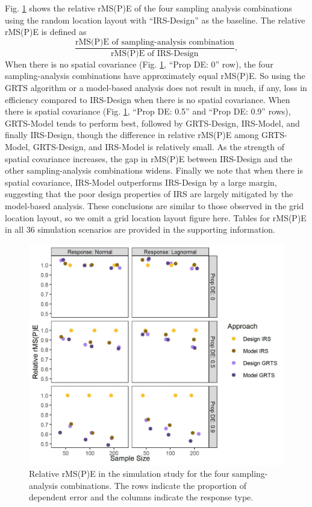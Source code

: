\documentclass[]{elsarticle} %
\begin{document}
Fig. \ref{fig:figeff} shows the relative rMS(P)E of the four sampling
analysis combinations using the random location layout with
``IRS-Design'' as the baseline. The relative rMS(P)E is defined as
\begin{equation*}
\frac{\text{rMS(P)E of sampling-analysis combination}}{\text{rMS(P)E of IRS-Design}},
\end{equation*} When there is no spatial covariance (Fig.
\ref{fig:figeff}, ``Prop DE: 0'' row), the four sampling-analysis
combinations have approximately equal rMS(P)E. So using the GRTS
algorithm or a model-based analysis does not result in much, if any,
loss in efficiency compared to IRS-Design when there is no spatial
covariance. When there is spatial covariance (Fig. \ref{fig:figeff},
``Prop DE: 0.5'' and ``Prop DE: 0.9'' rows), GRTS-Model tends to perform
best, followed by GRTS-Design, IRS-Model, and finally IRS-Design, though
the difference in relative rMS(P)E among GRTS-Model, GRTS-Design, and
IRS-Model is relatively small. As the strength of spatial covariance
increases, the gap in rMS(P)E between IRS-Design and the other
sampling-analysis combinations widens. Finally we note that when there
is spatial covariance, IRS-Model outperforms IRS-Design by a large
margin, suggesting that the poor design properties of IRS are largely
mitigated by the model-based analysis. These conclusions are similar to
those observed in the grid location layout, so we omit a grid location
layout figure here. Tables for rMS(P)E in all 36 simulation scenarios
are provided in the supporting information.

\begin{figure}
  \centering
  \includegraphics[width = 1\linewidth]{figures/rmspe_eff.jpeg}
  \caption{Relative rMS(P)E in the simulation study for the four sampling-analysis combinations. The rows indicate the proportion of dependent error and the columns indicate the response type.}
  \label{fig:figeff}
\end{figure}
\end{document}
